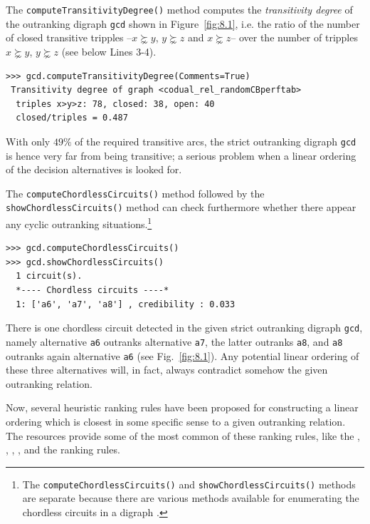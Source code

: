 The \texttt{computeTransitivityDegree()} method computes the \emph{transitivity degree} of the outranking digraph \texttt{gcd} shown in Figure~\vref{fig:8.1}, i.e. the ratio of the number of closed transitive tripples --$x \succnsim y$, $y \succnsim z$ and $x \succnsim z$-- over the number of tripples $x \succnsim y$, $y \succnsim z$ (see below Lines 3-4).
\begin{lstlisting}
>>> gcd.computeTransitivityDegree(Comments=True)
 Transitivity degree of graph <codual_rel_randomCBperftab>
  triples x>y>z: 78, closed: 38, open: 40
  closed/triples = 0.487
\end{lstlisting}    

With only $49\%$ of the required transitive arcs, the strict outranking digraph \texttt{gcd} is hence very far from being transitive; a serious problem when a linear ordering of the decision alternatives is looked for.

The \texttt{computeChordlessCircuits()} method followed by the \texttt{showChordlessCircuits()} method can check furthermore whether there appear any cyclic outranking situations.\footnote{The \texttt{computeChordlessCircuits()} and \texttt{showChordlessCircuits()} methods are separate because there are various methods available for enumerating the chordless circuits in a digraph \citep{BIS-2010}.}
\begin{lstlisting}
>>> gcd.computeChordlessCircuits()
>>> gcd.showChordlessCircuits()
  1 circuit(s).
  *---- Chordless circuits ----*    
  1: ['a6', 'a7', 'a8'] , credibility : 0.033
\end{lstlisting}

There is one chordless circuit detected in the given strict outranking digraph \texttt{gcd}, namely alternative \texttt{a6} outranks alternative \texttt{a7}, the latter outranks \texttt{a8}, and \texttt{a8} outranks again alternative \texttt{a6} (see Fig.~\vref{fig:8.1}). Any potential linear ordering of these three alternatives will, in fact, always contradict somehow the given outranking relation.

Now, several heuristic ranking rules have been proposed for constructing a linear ordering which is closest in some specific sense to a given outranking relation. The \Digraph resources provide some of the most common of these ranking rules, like the \Copeland, \Kemeny, \Slater, \Kohler, and the \RankedPairs ranking rules.

